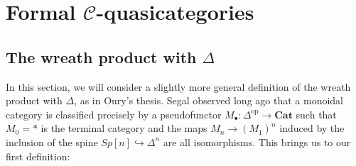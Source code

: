 \documentclass[leqno]{article}
\numberwithin{equation}{subsection}
\theoremstyle{plain}   %
\theoremstyle{remark}
\theoremstyle{plain}
\newcommand{\op}{\ensuremath{\mathrm{op}}}
\newcommand{\Cat}{\ensuremath{\mathbf{Cat}}}
\renewcommand{\C}{\ensuremath{\mathcal{C}}}
\begin{document}

\section{Formal \(\C\)-quasicategories}
\subsection{The wreath product with \(\Delta\)}
In this section, we will consider a slightly more general definition of the wreath product with \(\Delta\), as in Oury's thesis. Segal observed long ago that a monoidal category is classified precisely by a pseudofunctor \(M_\bullet:\Delta^\op\to \Cat\) such that \(M_0=\ast\) is the terminal category and the maps \(M_n \to {(M_1)}^n\) induced by the inclusion of the spine \(Sp[n]\hookrightarrow \Delta^n\) are all isomorphisms.  This brings us to our first definition:
\end{document}
